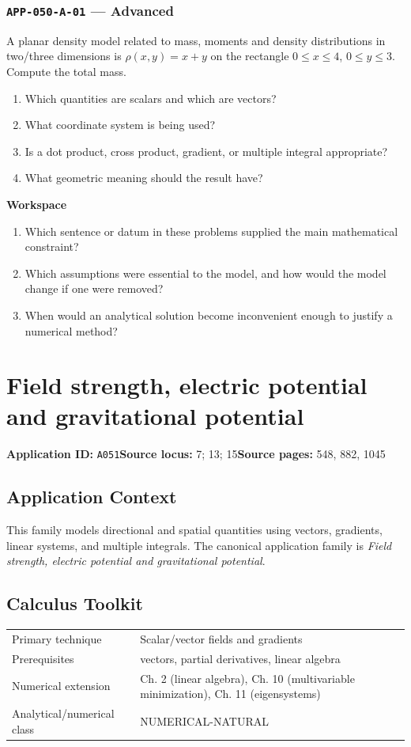 \documentclass[11pt]{book}
\newcommand{\pid}[1]{\texttt{#1}}
\newcommand{\workspace}{\par\vspace{0.7in}\hrulefill\par\vspace{0.55in}\hrulefill\par}
\begin{document}
\subsection*{\pid{APP-050-A-01} — Advanced}
\begin{problembox}
A planar density model related to mass, moments and density distributions in two/three dimensions is $\rho(x,y)=x+y$ on the rectangle $0\le x\le 4$, $0\le y\le 3$. Compute the total mass.
\end{problembox}
\begin{promptbox}\begin{enumerate}
\item Which quantities are scalars and which are vectors?
\item What coordinate system is being used?
\item Is a dot product, cross product, gradient, or multiple integral appropriate?
\item What geometric meaning should the result have?
\end{enumerate}\end{promptbox}
\textbf{Workspace}\workspace
\begin{reflectionbox}\begin{enumerate}
\item Which sentence or datum in these problems supplied the main mathematical constraint?
\item Which assumptions were essential to the model, and how would the model change if one were removed?
\item When would an analytical solution become inconvenient enough to justify a numerical method?
\end{enumerate}\end{reflectionbox}
\chapter{Field strength, electric potential and gravitational potential}\label{app:A051}
\textbf{Application ID:} \pid{A051}\quad \textbf{Source locus:} 7; 13; 15\quad \textbf{Source pages:} 548, 882, 1045
\section*{Application Context}
This family models directional and spatial quantities using vectors, gradients, linear systems, and multiple integrals. The canonical application family is \emph{Field strength, electric potential and gravitational potential}.
\section*{Calculus Toolkit}
\begin{tabularx}{\textwidth}{@{}lX@{}}\toprule
Primary technique & Scalar/vector fields and gradients \\
Prerequisites & vectors, partial derivatives, linear algebra \\
Numerical extension & Ch. 2 (linear algebra), Ch. 10 (multivariable minimization), Ch. 11 (eigensystems) \\
Analytical/numerical class & NUMERICAL-NATURAL \\
\bottomrule\end{tabularx}
\end{document}
